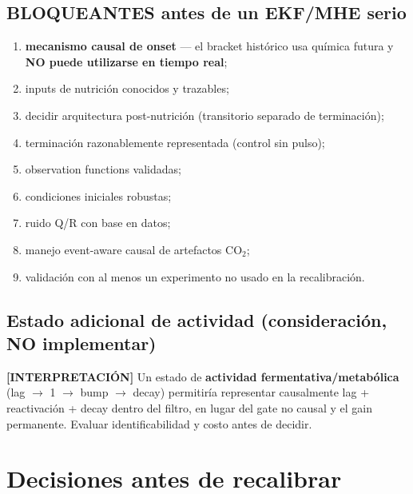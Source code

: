 \documentclass[11pt,a4paper]{article}
\newcommand{\interp}{\textcolor{interp}{\textbf{[INTERPRETACI\'ON]}}}
\begin{document}
\subsection{BLOQUEANTES antes de un EKF/MHE serio}
\begin{enumerate}[leftmargin=*,itemsep=1pt]
\item \textbf{mecanismo causal de onset} --- el bracket hist\'orico usa qu\'imica futura y \textbf{NO puede utilizarse en tiempo real};
\item inputs de nutrici\'on conocidos y trazables;
\item decidir arquitectura post-nutrici\'on (transitorio separado de terminaci\'on);
\item terminaci\'on razonablemente representada (control sin pulso);
\item observation functions validadas;
\item condiciones iniciales robustas;
\item ruido Q/R con base en datos;
\item manejo event-aware causal de artefactos CO$_2$;
\item validaci\'on con al menos un experimento no usado en la recalibraci\'on.
\end{enumerate}

\subsection{Estado adicional de actividad (consideraci\'on, NO implementar)}
\interp{} Un estado de \textbf{actividad fermentativa/metab\'olica} (lag $\to$ 1 $\to$ bump $\to$ decay) permitir\'ia representar causalmente lag + reactivaci\'on + decay dentro del filtro, en lugar del gate no causal y el gain permanente. Evaluar identificabilidad y costo antes de decidir.

\section{Decisiones antes de recalibrar}
\end{document}
